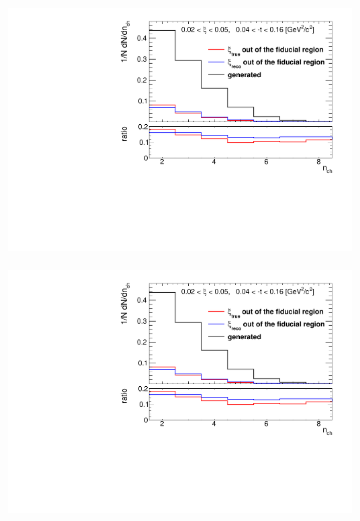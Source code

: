 \begin{figure}[h!]
	\vspace{-2.5cm}
	\centering
	\begin{subfigure}{.49\textwidth}
		\includegraphics[width=\textwidth,page=4]{chapters/chrgSTAR/img/xiMigration/xi.pdf}
	\end{subfigure}
	\begin{subfigure}{.49\textwidth}
		\includegraphics[width=\textwidth,page=5]{chapters/chrgSTAR/img/xiMigration/xi.pdf}
	\end{subfigure}
	\begin{subfigure}{.49\textwidth}

\end{subfigure}
\end{figure}
